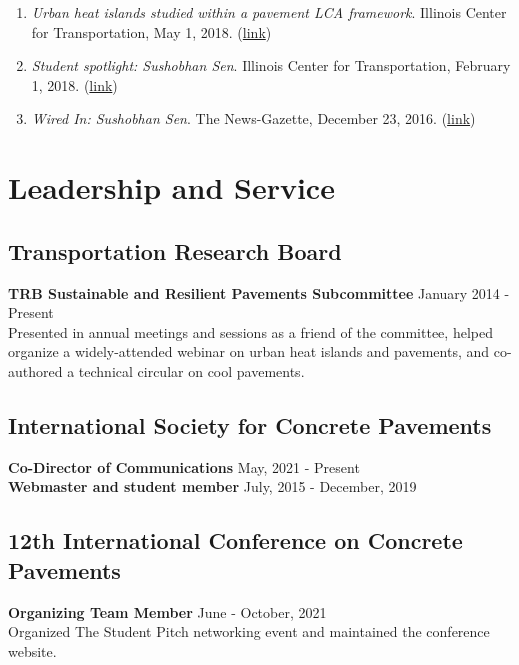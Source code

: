 \documentclass[12pt]{article}
\begin{document}
\begin{enumerate}[label=(M\arabic*)]
	\item \textit{Urban heat islands studied within a pavement LCA framework}. Illinois Center for Transportation, May 1, 2018. (\href{https://ict.illinois.edu/news/newsletters/more-newsletters/may-2018/urban-heat-islands-studied-within-a-pavement-lca-framework}{link})
	\item \textit{Student spotlight: Sushobhan Sen}. Illinois Center for Transportation, February 1, 2018. (\href{https://ict.illinois.edu/news/newsletters/more-newsletters/february-2018/student-spotlight-sushobhan-sen}{link})
	\item \textit{Wired In: Sushobhan Sen}. The News-Gazette, December 23, 2016. (\href{https://www.news-gazette.com/multimedia/video/wired-in-sushobhan-sen/article_52527b7b-4b7f-5642-88c8-bf4bb2fd5e2f.html}{link})
\end{enumerate}

\bigskip
\section*{Leadership and Service} 
\hfill
\subsection*{Transportation Research Board}
\textbf{TRB Sustainable and Resilient Pavements Subcommittee} \hfill January 2014 - Present \\
Presented in annual meetings and sessions as a friend of the committee, helped organize a widely-attended webinar on urban heat islands and pavements, and co-authored a technical circular on cool pavements. \\

\subsection*{International Society for Concrete Pavements}
\textbf{Co-Director of Communications} \hfill May, 2021 - Present \\
\textbf{Webmaster and student member} \hfill July, 2015 - December, 2019 \\

\subsection*{12th International Conference on Concrete Pavements}
\textbf{Organizing Team Member} \hfill June - October, 2021 \\
Organized The Student Pitch networking event and maintained the conference website. \\
\end{document}
